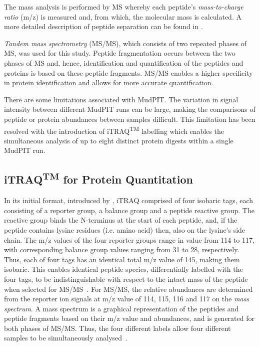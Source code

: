 \documentclass[11pt,a4paper]{article}
\begin{document}
The mass analysis is performed by MS whereby each peptide's \emph{mass-to-charge ratio} (m/z) is measured and, from which, the molecular mass is calculated. A more detailed description of peptide separation can be found in \cite{Eidhammer2008}. 

\emph{Tandem mass spectrometry} (MS/MS), which consists of two repeated phases of MS, was used for this study. Peptide fragmentation occurs between the two phases of MS and, hence, identification and quantification of the peptides and proteins is based on these peptide fragments. MS/MS enables a higher specificity in protein identification and allows for more accurate quantification.

There are some limitations associated with MudPIT. The variation in signal intensity between different MudPIT runs can be large, making the comparisons of peptide or protein abundances between samples difficult. This limitation has been resolved with the introduction of iTRAQ\textsuperscript{TM} labelling which enables the simultaneous analysis of up to eight distinct protein digests within a single MudPIT run.

\subsection{iTRAQ\textsuperscript{TM} for Protein Quantitation}\label{sec:iTRAQ}
In its initial format, introduced by \cite{Ross2004}, iTRAQ comprised of four isobaric tags, each consisting of a reporter group, a balance group and a peptide reactive group. The reactive group binds the N-terminus at the start of each peptide, and, if the peptide contains lysine residues (i.e. amino acid) then, also on the lysine's side chain. The m/z values of the four reporter groups range in value from 114 to 117, with corresponding balance group values ranging from 31 to 28, respectively. Thus, each of four tags has an identical total m/z value of 145, making them isobaric. This enables identical peptide species, differentially labelled with the four tags, to be indistinguishable with respect to the intact mass of the peptide when selected for MS/MS~\citep{Ross2004}. For MS/MS, the relative abundances are determined from the reporter ion signals at m/z value of 114, 115, 116 and 117 on the \emph{mass spectrum}. A mass spectrum is a graphical representation of the peptides and peptide fragments based on their m/z value and abundances, and is generated for both phases of MS/MS. Thus, the four different labels allow four different samples to be simultaneously analysed~\citep{Ross2004}.
  
\end{document}
